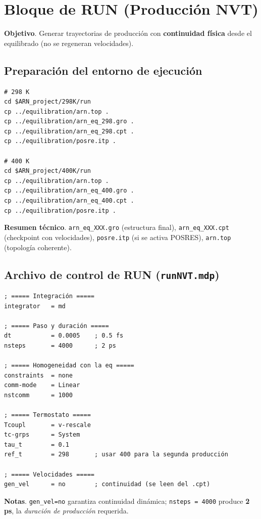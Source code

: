 \documentclass[12pt,a4paper]{article}
\begin{document}
\section{Bloque de RUN (Producción NVT)}
\label{sec:run}
\textbf{Objetivo}. Generar trayectorias de producción con \textbf{continuidad física} desde el equilibrado (no se regeneran velocidades).

\subsection{Preparación del entorno de ejecución}
\begin{lstlisting}[style=bashstyle]
# 298 K
cd $ARN_project/298K/run
cp ../equilibration/arn.top .
cp ../equilibration/arn_eq_298.gro .
cp ../equilibration/arn_eq_298.cpt .
cp ../equilibration/posre.itp .

# 400 K
cd $ARN_project/400K/run
cp ../equilibration/arn.top .
cp ../equilibration/arn_eq_400.gro .
cp ../equilibration/arn_eq_400.cpt .
cp ../equilibration/posre.itp .
\end{lstlisting}
\textbf{Resumen técnico}. \texttt{arn\_eq\_XXX.gro} (estructura final), \texttt{arn\_eq\_XXX.cpt} (checkpoint con velocidades), \texttt{posre.itp} (si se activa POSRES), \texttt{arn.top} (topología coherente).

\subsection{Archivo de control de RUN (\texttt{runNVT.mdp})}
\begin{Verbatim}[fontsize=\small,frame=single]
; ===== Integración =====
integrator   = md

; ===== Paso y duración =====
dt           = 0.0005    ; 0.5 fs
nsteps       = 4000      ; 2 ps

; ===== Homogeneidad con la eq =====
constraints  = none
comm-mode    = Linear
nstcomm      = 1000

; ===== Termostato =====
Tcoupl       = v-rescale
tc-grps      = System
tau_t        = 0.1
ref_t        = 298       ; usar 400 para la segunda producción

; ===== Velocidades =====
gen_vel      = no        ; continuidad (se leen del .cpt)
\end{Verbatim}
\textbf{Notas}. \texttt{gen\_vel=no} garantiza continuidad dinámica; \texttt{nsteps = 4000} produce \textbf{2 ps}, la \emph{duración de producción} requerida.
\end{document}
